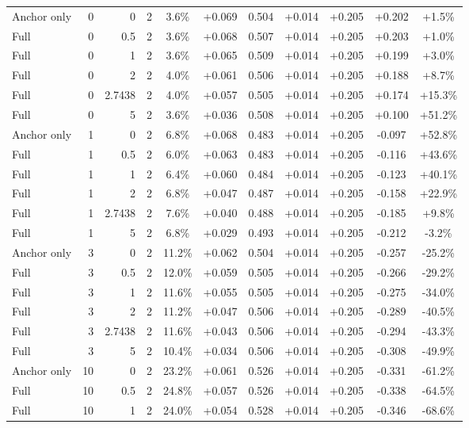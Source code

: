 \begin{table}[htbp]
\begin{tabular}{lrrrccccccc}
Anchor only & 0 & 0 & 2 & 3.6\% & +0.069 & 0.504 & +0.014 & +0.205 & +0.202 & +1.5\% \\
Full & 0 & 0.5 & 2 & 3.6\% & +0.068 & 0.507 & +0.014 & +0.205 & +0.203 & +1.0\% \\
Full & 0 & 1 & 2 & 3.6\% & +0.065 & 0.509 & +0.014 & +0.205 & +0.199 & +3.0\% \\
Full & 0 & 2 & 2 & 4.0\% & +0.061 & 0.506 & +0.014 & +0.205 & +0.188 & +8.7\% \\
Full & 0 & 2.7438 & 2 & 4.0\% & +0.057 & 0.505 & +0.014 & +0.205 & +0.174 & +15.3\% \\
Full & 0 & 5 & 2 & 3.6\% & +0.036 & 0.508 & +0.014 & +0.205 & +0.100 & +51.2\% \\
Anchor only & 1 & 0 & 2 & 6.8\% & +0.068 & 0.483 & +0.014 & +0.205 & -0.097 & +52.8\% \\
Full & 1 & 0.5 & 2 & 6.0\% & +0.063 & 0.483 & +0.014 & +0.205 & -0.116 & +43.6\% \\
Full & 1 & 1 & 2 & 6.4\% & +0.060 & 0.484 & +0.014 & +0.205 & -0.123 & +40.1\% \\
Full & 1 & 2 & 2 & 6.8\% & +0.047 & 0.487 & +0.014 & +0.205 & -0.158 & +22.9\% \\
Full & 1 & 2.7438 & 2 & 7.6\% & +0.040 & 0.488 & +0.014 & +0.205 & -0.185 & +9.8\% \\
Full & 1 & 5 & 2 & 6.8\% & +0.029 & 0.493 & +0.014 & +0.205 & -0.212 & -3.2\% \\
Anchor only & 3 & 0 & 2 & 11.2\% & +0.062 & 0.504 & +0.014 & +0.205 & -0.257 & -25.2\% \\
Full & 3 & 0.5 & 2 & 12.0\% & +0.059 & 0.505 & +0.014 & +0.205 & -0.266 & -29.2\% \\
Full & 3 & 1 & 2 & 11.6\% & +0.055 & 0.505 & +0.014 & +0.205 & -0.275 & -34.0\% \\
Full & 3 & 2 & 2 & 11.2\% & +0.047 & 0.506 & +0.014 & +0.205 & -0.289 & -40.5\% \\
Full & 3 & 2.7438 & 2 & 11.6\% & +0.043 & 0.506 & +0.014 & +0.205 & -0.294 & -43.3\% \\
Full & 3 & 5 & 2 & 10.4\% & +0.034 & 0.506 & +0.014 & +0.205 & -0.308 & -49.9\% \\
Anchor only & 10 & 0 & 2 & 23.2\% & +0.061 & 0.526 & +0.014 & +0.205 & -0.331 & -61.2\% \\
Full & 10 & 0.5 & 2 & 24.8\% & +0.057 & 0.526 & +0.014 & +0.205 & -0.338 & -64.5\% \\
Full & 10 & 1 & 2 & 24.0\% & +0.054 & 0.528 & +0.014 & +0.205 & -0.346 & -68.6\% \\

\end{tabular}
\end{table}
